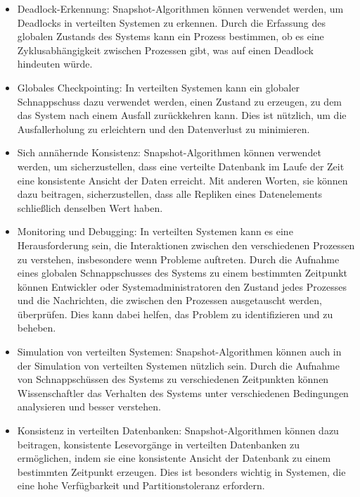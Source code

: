 \begin{itemize}
\item Deadlock-Erkennung: Snapshot-Algorithmen können verwendet werden, um Deadlocks in verteilten Systemen zu erkennen. Durch die Erfassung des globalen Zustands des Systems kann ein Prozess bestimmen, ob es eine Zyklusabhängigkeit zwischen Prozessen gibt, was auf einen Deadlock hindeuten würde.
\item Globales Checkpointing: In verteilten Systemen kann ein globaler Schnappschuss dazu verwendet werden, einen Zustand zu erzeugen, zu dem das System nach einem Ausfall zurückkehren kann. Dies ist nützlich, um die Ausfallerholung zu erleichtern und den Datenverlust zu minimieren.
\item Sich annähernde Konsistenz: Snapshot-Algorithmen können verwendet werden, um sicherzustellen, dass eine verteilte Datenbank im Laufe der Zeit eine konsistente Ansicht der Daten erreicht. Mit anderen Worten, sie können dazu beitragen, sicherzustellen, dass alle Repliken eines Datenelements schließlich denselben Wert haben.
\item Monitoring und Debugging: In verteilten Systemen kann es eine Herausforderung sein, die Interaktionen zwischen den verschiedenen Prozessen zu verstehen, insbesondere wenn Probleme auftreten. Durch die Aufnahme eines globalen Schnappschusses des Systems zu einem bestimmten Zeitpunkt können Entwickler oder Systemadministratoren den Zustand jedes Prozesses und die Nachrichten, die zwischen den Prozessen ausgetauscht werden, überprüfen. Dies kann dabei helfen, das Problem zu identifizieren und zu beheben.
\item Simulation von verteilten Systemen: Snapshot-Algorithmen können auch in der Simulation von verteilten Systemen nützlich sein. Durch die Aufnahme von Schnappschüssen des Systems zu verschiedenen Zeitpunkten können Wissenschaftler das Verhalten des Systems unter verschiedenen Bedingungen analysieren und besser verstehen.
\item Konsistenz in verteilten Datenbanken: Snapshot-Algorithmen können dazu beitragen, konsistente Lesevorgänge in verteilten Datenbanken zu ermöglichen, indem sie eine konsistente Ansicht der Datenbank zu einem bestimmten Zeitpunkt erzeugen. Dies ist besonders wichtig in Systemen, die eine hohe Verfügbarkeit und Partitionstoleranz erfordern.
\end{itemize}

